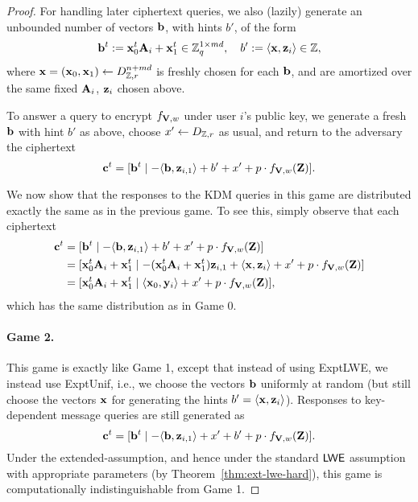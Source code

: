 \begin{proof}
  For handling later ciphertext queries, we also (lazily) generate an
  unbounded number of \lwe vectors $\mathbf{b}$, with hints $b'$, of the
  form \[ \mathbf{b}^{t} := \mathbf{x}_{0}^{t} \mathbf{A}_i + \mathbf{x}_{1}^{t} \in
  \mathbb{Z}_q^{1 \times md}, \quad b' := \langle{\ensuremath{\mathbf{x}}, \ensuremath{\mathbf{z}}_{i}}\rangle \in \mathbb{Z}, \]
  where $\mathbf{x} = (\mathbf{x}_{0},\mathbf{x}_{1}) \gets D_{\mathbb{Z},r}^{n+md}$ is
  freshly chosen for each $\mathbf{b}$, and are amortized over the same
  fixed $\mathbf{A}_{i}$, $\mathbf{z}_{i}$ chosen above.
  
  To answer a query to encrypt $f_{\mathbf{V},w}$ under user $i$'s public
  key, we generate a fresh $\mathbf{b}$ with hint $b'$ as above, choose $x'
  \gets D_{\mathbb{Z}, r}$ as usual, and return to the adversary the
  ciphertext
  \[\mathbf{c}^t = [\mathbf{b}^t \mid -\langle{\ensuremath{\mathbf{b}}, \ensuremath{\mathbf{z}}_{i,1}}\rangle + b' + x' +
  p\cdot f_{\mathbf{V}, w}(\mathbf{Z})]. \]

  We now show that the responses to the KDM queries in this game are
  distributed exactly the same as in the previous game.  To see this,
  simply observe that each ciphertext
  \begin{align*}
    \mathbf{c}^{t} &= [\mathbf{b}^t \mid -\langle{\ensuremath{\mathbf{b}}, \ensuremath{\mathbf{z}}_{i,1}}\rangle +
    b' + x' + p\cdot f_{\mathbf{V}, w}(\mathbf{Z})] \\
    &= [\mathbf{x}_{0}^{t} \mathbf{A}_{i} + \mathbf{x}_{1}^{t} \mid -(\mathbf{x}_{0}^{t}
    \mathbf{A}_{i} + \mathbf{x}_{1}^{t}) \mathbf{z}_{i,1} + \langle{\ensuremath{\mathbf{x}}, \ensuremath{\mathbf{z}}_{i}}\rangle
    + x' + p\cdot f_{\mathbf{V}, w}(\mathbf{Z})] \\
    &= [\mathbf{x}_{0}^{t} \mathbf{A}_{i} + \mathbf{x}_{1}^{t} \mid \langle{\ensuremath{\mathbf{x}}_{0},
      \ensuremath{\mathbf{y}}_{i}}\rangle + x' + p\cdot f_{\mathbf{V}, w}(\mathbf{Z})],
  \end{align*}
  which has the same distribution as in Game 0.

  \paragraph{Game 2.} This game is exactly like Game 1, except that
  instead of using \textsf{ExptLWE}, we instead use \textsf{ExptUnif},
  i.e., we choose the vectors $\mathbf{b}$ uniformly at random (but still
  choose the vectors $\mathbf{x}$ for generating the hints
  $b'=\langle{\ensuremath{\mathbf{x}},\ensuremath{\mathbf{z}}_{i}}\rangle$).  Responses to key-dependent message
  queries are still generated as
  \[\mathbf{c}^t = [\mathbf{b}^t \mid -\langle{\ensuremath{\mathbf{b}},
    \ensuremath{\mathbf{z}}_{i,1}}\rangle + x' + b' + p\cdot f_{\mathbf{V}, w}(\mathbf{Z})].\] Under the
  extended-\lwe assumption, and hence under the standard $\mathsf{LWE}$
  assumption with appropriate parameters (by
  Theorem~\ref{thm:ext-lwe-hard}), this game is computationally
  indistinguishable from Game 1.


\end{proof}
